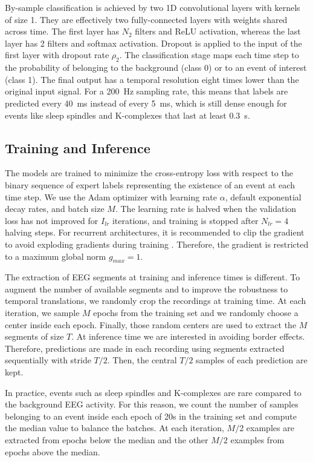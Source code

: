 \documentclass[conference]{IEEEtran}
\begin{document}
By-sample classification is achieved by two 1D convolutional layers with kernels of size 1. They are effectively two fully-connected layers with weights shared across time. The first layer has $N_2$ filters and ReLU activation, whereas the last layer has 2 filters and softmax activation. Dropout is applied to the input of the first layer with dropout rate $\rho_2$. The classification stage maps each time step to the probability of belonging to the background (class 0) or to an event of interest (class 1). The final output has a temporal resolution eight times lower than the original input signal. For a 200~Hz sampling rate, this means that labels are predicted every 40~ms instead of every 5~ms, which is still dense enough for events like sleep spindles and K-complexes that last at least 0.3~s.

\subsection{Training and Inference}
\label{sec:train}

The models are trained to minimize the cross-entropy loss with respect to the binary sequence of expert labels representing the existence of an event at each time step. We use the Adam optimizer \cite{kingma2014adam} with learning rate $\alpha$, default exponential decay rates, and batch size $M$. The learning rate is halved when the validation loss has not improved for $I_{lr}$ iterations, and training is stopped after $N_{lr}=4$ halving steps. For recurrent architectures, it is recommended to clip the gradient to avoid exploding gradients during training \cite{pascanu2013difficulty}. Therefore, the gradient is restricted to a maximum global norm $g_{max}=1$. 

The extraction of EEG segments at training and inference times is different. To augment the number of available segments and to improve the robustness to temporal translations, we randomly crop the recordings at training time. At each iteration, we sample $M$ epochs from the training set and we randomly choose a center inside each epoch. Finally, those random centers are used to extract the $M$ segments of size $T$. At inference time we are interested in avoiding border effects. Therefore, predictions are made in each recording using segments extracted sequentially with stride $T/2$. Then, the central $T/2$ samples of each prediction are kept.

In practice, events such as sleep spindles and K-complexes are rare compared to the background EEG activity. For this reason, we count the number of samples belonging to an event inside each epoch of 20s in the training set and compute the median value to balance the batches. At each iteration, $M/2$ examples are extracted from epochs below the median and the other $M/2$ examples from epochs above the median.
\end{document}
